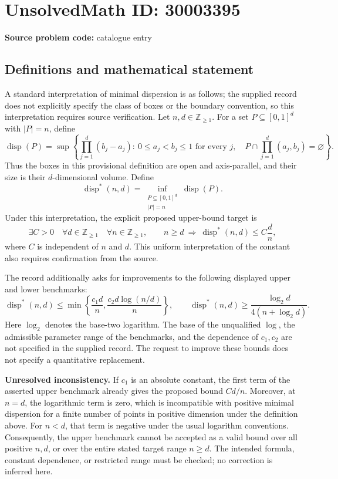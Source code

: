 \documentclass[11pt]{article}
\newcommand{\Z}{\mathbb{Z}}
\begin{document}
\section*{UnsolvedMath ID: 30003395}
\textbf{Source problem code:} catalogue entry
\subsection{Definitions and mathematical statement}
A standard interpretation of minimal dispersion is as follows; the supplied record does not explicitly specify the class of boxes or the boundary convention, so this interpretation requires source verification. Let \(n,d\in\Z_{\geq 1}\). For a set \(P\subseteq[0,1]^d\) with \(|P|=n\), define
\[
\operatorname{disp}(P)=\sup\left\{\prod_{j=1}^{d}(b_j-a_j):\ 0\leq a_j<b_j\leq1\text{ for every }j,\quad P\cap\prod_{j=1}^{d}(a_j,b_j)=\varnothing\right\}.
\]
Thus the boxes in this provisional definition are open and axis-parallel, and their size is their \(d\)-dimensional volume. Define
\[
\operatorname{disp}^{*}(n,d)=\inf_{\substack{P\subseteq[0,1]^d\\ |P|=n}}\operatorname{disp}(P).
\]
Under this interpretation, the explicit proposed upper-bound target is
\[
\exists C>0\quad\forall d\in\Z_{\geq1}\quad\forall n\in\Z_{\geq1},\qquad n\geq d\ \Longrightarrow\ \operatorname{disp}^{*}(n,d)\leq C\frac{d}{n},
\]
where \(C\) is independent of \(n\) and \(d\). This uniform interpretation of the constant also requires confirmation from the source.

The record additionally asks for improvements to the following displayed upper and lower benchmarks:
\[
\operatorname{disp}^{*}(n,d)\leq\min\left\{\frac{c_1d}{n},\frac{c_2d\log(n/d)}{n}\right\},
\qquad
\operatorname{disp}^{*}(n,d)\geq\frac{\log_2 d}{4(n+\log_2 d)}.
\]
Here \(\log_2\) denotes the base-two logarithm. The base of the unqualified \(\log\), the admissible parameter range of the benchmarks, and the dependence of \(c_1,c_2\) are not specified in the supplied record. The request to improve these bounds does not specify a quantitative replacement.

\textbf{Unresolved inconsistency.} If \(c_1\) is an absolute constant, the first term of the asserted upper benchmark already gives the proposed bound \(Cd/n\). Moreover, at \(n=d\), the logarithmic term is zero, which is incompatible with positive minimal dispersion for a finite number of points in positive dimension under the definition above. For \(n<d\), that term is negative under the usual logarithm conventions. Consequently, the upper benchmark cannot be accepted as a valid bound over all positive \(n,d\), or over the entire stated target range \(n\geq d\). The intended formula, constant dependence, or restricted range must be checked; no correction is inferred here.
\end{document}

